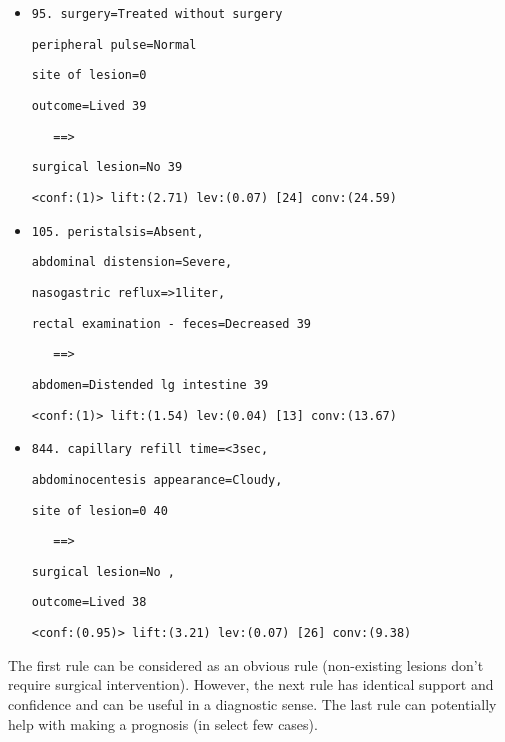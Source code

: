 \begin{itemize}

\item \verb|95. surgery=Treated without surgery |

\verb|peripheral pulse=Normal| 

\verb|site of lesion=0| 

\verb|outcome=Lived 39| 

\verb|   ==>|

\verb|surgical lesion=No 39|

\verb|<conf:(1)> lift:(2.71) lev:(0.07) [24] conv:(24.59)|


\item \verb|105. peristalsis=Absent,|

\verb|abdominal distension=Severe,|

\verb|nasogastric reflux=>1liter,|

\verb|rectal examination - feces=Decreased 39|

\verb|   ==>|

\verb|abdomen=Distended lg intestine 39|

\verb|<conf:(1)> lift:(1.54) lev:(0.04) [13] conv:(13.67)|


\item \verb|844. capillary refill time=<3sec,|

\verb|abdominocentesis appearance=Cloudy,|

\verb|site of lesion=0 40| 

\verb|   ==>|

\verb|surgical lesion=No ,|

\verb|outcome=Lived 38|

\verb|<conf:(0.95)> lift:(3.21) lev:(0.07) [26] conv:(9.38)|
\end{itemize}
%
The first rule can be considered as an obvious rule (non-existing lesions don't require surgical intervention).
However, the next rule has identical support and confidence and can be useful in a diagnostic sense.
The last rule can potentially help with making a prognosis (in select few cases).